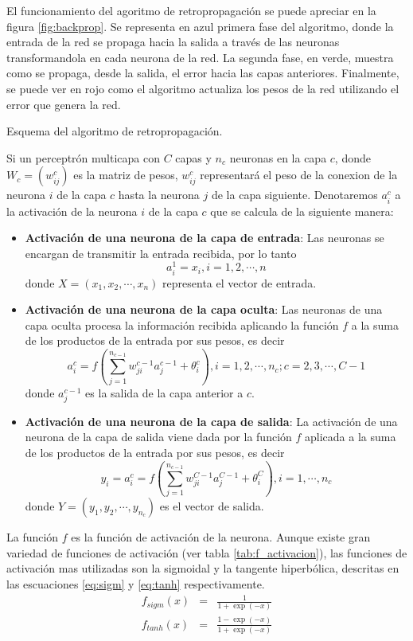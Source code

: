 El funcionamiento del agoritmo de retropropagación se puede apreciar en la figura \ref{fig:backprop}. Se representa en azul primera fase del algoritmo, donde la entrada de la red se propaga hacia la salida a través de las neuronas transformandola en cada neurona de la red. La segunda fase, en verde, muestra como se propaga, desde la salida, el error hacia las capas anteriores. Finalmente, se puede ver en rojo como el algoritmo actualiza los pesos de la red utilizando el error que genera la red.
\begin{imagen}
	\scalebox{1.0}{}
	\caption{Esquema del algoritmo de retropropagación.}
	\label{fig:backprop}
\end{imagen}

Si un perceptrón multicapa con $C$ capas y $n_c$ neuronas en la capa $c$, donde $W_c = (w^{c}_{ij})$ es la matriz de pesos, $w^{c}_{ij}$ representará el peso de la conexion de la neurona $i$ de la capa $c$ hasta la neurona $j$ de la capa siguiente. Denotaremos $a^{c}_{i}$ a la activación de la neurona $i$ de la capa $c$ que se calcula de la siguiente manera:
\begin{itemize}
	\item {\bf Activación de una neurona de la capa de entrada}: Las neuronas se encargan de transmitir la entrada recibida, por lo tanto $$ a^{1}_{i} = x_{i}, i = 1, 2, \cdots, n$$ donde $X = (x_1, x_2, \cdots, x_n)$ representa el vector de entrada.

	\item {\bf Activación de una neurona de la capa oculta}: Las neuronas de una capa oculta procesa la información recibida aplicando la función $f$ a la suma de los productos de la entrada por sus pesos, es decir $$ a^{c}_{i} = f\left(\sum^{n_{c - 1}}_{j=1} w^{c - 1}_{ji}a^{c - 1}_{j} + \theta^{c}_{i}\right), i = 1, 2, \cdots, n_c; c = 2, 3, \cdots, C - 1$$ donde $a^{c - 1}_{j}$ es la salida de la capa anterior a $c$.

	\item {\bf Activación de una neurona de la capa de salida}: La activación de una neurona de la capa de salida viene dada por la función $f$ aplicada a la suma de los productos de la entrada por sus pesos, es decir $$ y_{i} = a^{c}_{i} = f\left(\sum^{n_{c - 1}}_{j=1} w^{C - 1}_{ji}a^{C - 1}_{j} + \theta^{C}_{i}\right), i = 1, \cdots, n_c$$ donde $Y = (y_1, y_2, \cdots, y_{n_{c}})$ es el vector de salida.
\end{itemize}

La función $f$ es la función de activación de la neurona. Aunque existe gran variedad de funciones de activación (ver tabla \ref{tab:f_activacion}), las funciones de activación mas utilizadas son la sigmoidal y la tangente hiperbólica, descritas en las escuaciones \ref{eq:sigm} y \ref{eq:tanh} respectivamente.
\begin{eqnarray}
	f_{sigm}(x) &=& \frac{1}{1+\exp(-x)}\label{eq:sigm}\\
	f_{tanh}(x) &=& \frac{1 - \exp(-x)}{1 + \exp(-x)}\label{eq:tanh}
\end{eqnarray}

